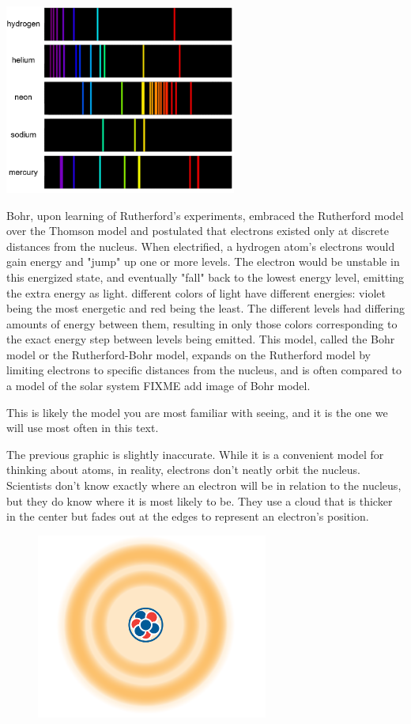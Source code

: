 \noindent\includegraphics[width=3in]{spectral_lines.png}


Bohr, upon learning of Rutherford's experiments,
embraced the Rutherford model over the Thomson model and postulated that electrons
existed only at discrete distances from the nucleus. When electrified, a hydrogen
atom's electrons would gain energy and "jump" up one or more levels. The electron
would be unstable in this energized state, and eventually "fall" back to the
lowest energy level, emitting the extra energy as light. different colors of
light have different energies: violet being the most energetic and red being the
least. The different levels had differing amounts of energy between them,
resulting in only those colors corresponding to the exact energy step between
levels being emitted. This model, called the Bohr model or the Rutherford-Bohr
model, expands on the Rutherford model by limiting electrons to specific
distances from the nucleus, and is often compared to a model of the solar system
FIXME add image of Bohr model.

This is likely the model you are most familiar with seeing, and it is the one we
will use most often in this text.


The previous graphic is slightly inaccurate. While it is a convenient model for
thinking about atoms, in reality, electrons don't neatly orbit the nucleus.
Scientists don't know exactly where an electron will be in relation to the
nucleus, but they do know where it is most likely to be. They use a cloud that is
thicker in the center but fades out at the edges to represent an electron's
position.


\begin{figure}
\noindent\includegraphics[trim={0 5cm 0 0}, width=3in]{atomCloud.png}
\end{figure}


